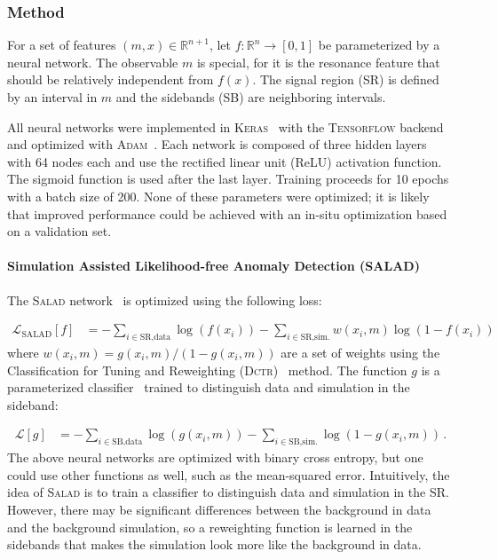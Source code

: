 \documentclass[a4paper,11pt]{article}
\begin{document}
\subsubsection{Method}


For a set of features $(m,x)\in\mathbb{R}^{n+1}$, let $f:\mathbb{R}^n\rightarrow [0,1]$ be parameterized by a neural network. The observable $m$ is special, for it is the resonance feature that should be relatively independent from $f(x)$.  The signal region (SR) is defined by an interval in $m$ and the sidebands (SB) are neighboring intervals.

All neural networks were implemented in \textsc{Keras}~\cite{keras} with the \textsc{Tensorflow} backend~\cite{tensorflow} and optimized with \textsc{Adam}~\cite{adam}.   Each network is composed of three hidden layers with 64 nodes each and use the rectified linear unit (ReLU) activation function.  The sigmoid function is used after the last layer.  Training proceeds for 10 epochs with a batch size of 200.   None of these parameters were optimized; it is likely that improved performance could be achieved with an in-situ optimization based on a validation set.

\paragraph{Simulation Assisted Likelihood-free Anomaly Detection (SALAD)}

The \textsc{Salad} network~\cite{Andreassen:2020nkr} is optimized using the following loss:

\begin{align}
\mathcal{L}_\text{SALAD}[f]&=-\sum_{i\in\text{SR,data}}\log(f(x_i))-\sum_{i\in\text{SR,sim.}}w(x_i,m)\log(1-f(x_i))\,
\end{align}
where $w(x_i,m)=g(x_i,m)/(1-g(x_i,m))$ are a set of weights using the Classification for Tuning and Reweighting (\textsc{Dctr})~\cite{Andreassen:2019nnm} method.  The function $g$ is a parameterized classifier~\cite{Cranmer:2015bka,Baldi:2016fzo} trained to distinguish data and simulation in the sideband:

\begin{align}
\mathcal{L}[g]&=-\sum_{i\in\text{SB,data}}\log(g(x_i,m))-\sum_{i\in\text{SB,sim.}}\log(1-g(x_i,m))\,.
\end{align}
The above neural networks are optimized with binary cross entropy, but one could use other functions as well, such as the mean-squared error.  Intuitively, the idea of \textsc{Salad} is to train a classifier to distinguish data and simulation in the SR.  However, there may be significant differences between the background in data and the background simulation, so a reweighting function is learned in the sidebands that makes the simulation look more like the background in data.  
\end{document}
